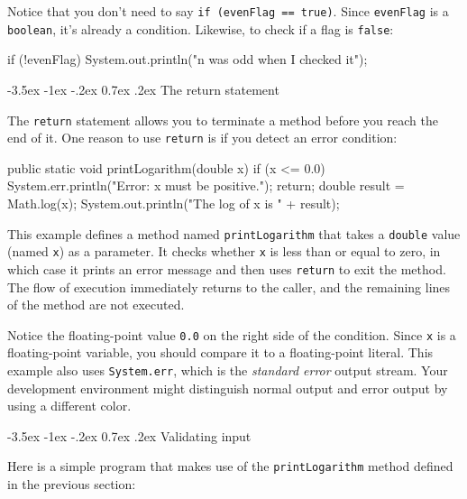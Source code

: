 \documentclass[12pt]{book}
\makeatletter
\renewcommand{\section}{\@startsection {section}{1}{\z@}%
    {-3.5ex \@plus -1ex \@minus -.2ex}%
    {0.7ex \@plus.2ex}%
    {\normalfont\Large\bfseries}}
\theoremstyle{exercise}
\newcommand{\java}[1]{\lstinline{#1}} %
\makeatother
\begin{document}
Notice that you don't need to say \java{if (evenFlag == true)}.
Since \java{evenFlag} is a \java{boolean}, it's already a condition.
Likewise, to check if a flag is \java{false}:

\begin{code}
    if (!evenFlag) {
        System.out.println("n was odd when I checked it");
    }
\end{code}


\section{The return statement}


The \java{return} statement allows you to terminate a method before you reach the end of it.
One reason to use \java{return} is if you detect an error condition:

\begin{code}
    public static void printLogarithm(double x) {
        if (x <= 0.0) {
            System.err.println("Error: x must be positive.");
            return;
        }
        double result = Math.log(x);
        System.out.println("The log of x is " + result);
    }
\end{code}

This example defines a method named \java{printLogarithm} that takes a \java{double} value (named \java{x}) as a parameter.
It checks whether \java{x} is less than or equal to zero, in which case it prints an error message and then uses \java{return} to exit the method.
The flow of execution immediately returns to the caller, and the remaining lines of the method are not executed.


Notice the floating-point value \java{0.0} on the right side of the condition.
Since \java{x} is a floating-point variable, you should compare it to a floating-point literal.
This example also uses \java{System.err}, which is the {\it standard error} output stream.
Your development environment might distinguish normal output and error output by using a different color.


\section{Validating input}

Here is a simple program that makes use of the \java{printLogarithm} method defined in the previous section:
\end{document}
